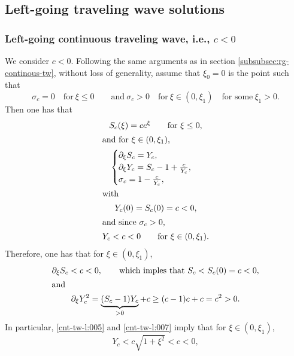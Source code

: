 \documentclass[12pt]{article}
\theoremstyle{definition}
\theoremstyle{remark}
\numberwithin{equation}{section}
\begin{document}
\subsection{Left-going traveling wave solutions}
\label{subsec:left-going-tw}

\subsubsection{Left-going continuous traveling wave, i.e., $ c < 0 $}
\label{subsubsec:lg-continous-tw}

We consider $ c < 0 $. Following the same arguments as in section \ref{subsubsec:rg-continous-tw}, without loss of generality, assume that $ \xi_0 = 0 $ is the point such that
\begin{equation}
    \label{cnt-tw-l:001}
    \sigma_c = 0 \quad \text{for} \ \xi \leq 0 \qquad \text{and} \ \sigma_c > 0 \quad \text{for} \ \xi \in (0,\xi_1) \quad \text{for some} \ \xi_1 > 0. 
\end{equation}
Then one has that 
\begin{gather}
    \label{cnt-tw-l:002}
    S_c(\xi) = c e^\xi \qquad \text{for} \ \xi \leq 0, \\
    \intertext{and for $ \xi \in (0,\xi_1) $,}
    \label{cnt-tw-l:003}
    \begin{cases}
        \partial_\xi S_c = Y_c, \\
        \partial_\xi Y_c = S_c - 1 + \frac{c}{Y_c},\\
        \sigma_c = 1- \frac{c}{Y_c},
    \end{cases}\\
    \intertext{with}
    \label{cnt-tw-l:004}
    Y_c(0) = S_c(0) = c < 0,\\
    \intertext{and since $ \sigma_c > 0 $, }
    \label{cnt-tw-l:005}
    Y_c < c<0 \qquad \text{for} \ \xi \in (0,\xi_1).
\end{gather}
Therefore, one has that for $ \xi \in (0,\xi_1) $, 
\begin{gather}
    \label{cnt-tw-l:006}
    \partial_\xi S_c < c < 0, \qquad \text{which imples that} \ S_c < S_c(0) = c <0, \\
    \intertext{and}
    \label{cnt-tw-l:007}
    \partial_\xi Y_c^2 = \underbrace{(S_c -1 )Y_c}_{> 0} + c \geq (c-1)c + c = c^2 > 0.
\end{gather}
In particular, \eqref{cnt-tw-l:005} and \eqref{cnt-tw-l:007} imply that for $ \xi \in (0,\xi_1) $, 
\begin{equation}
    \label{cnt-tw-l:008}
    Y_c < c \sqrt{1+\xi^2} < c < 0,
\end{equation}
\end{document}
